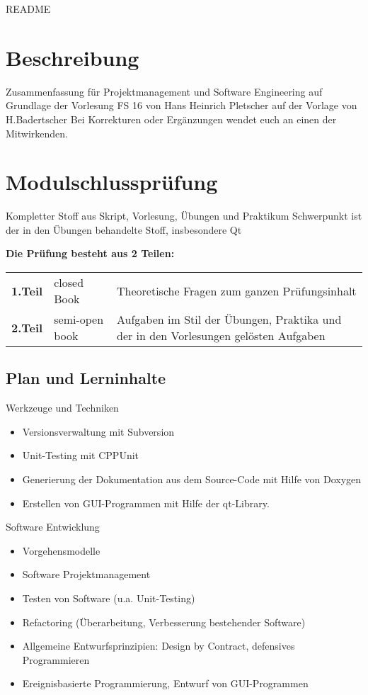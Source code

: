 \thispagestyle{empty}
\setcounter{page}{0} %
{\huge README }
\section*{Beschreibung}
Zusammenfassung für Projektmanagement und Software Engineering auf Grundlage der Vorlesung FS 16 von Hans Heinrich Pletscher auf der Vorlage von H.Badertscher \newline
Bei Korrekturen oder Ergänzungen wendet euch an einen der Mitwirkenden.

\section*{Modulschlussprüfung}
Kompletter Stoff aus Skript, Vorlesung, Übungen und Praktikum \newline
Schwerpunkt ist der in den Übungen behandelte Stoff, insbesondere Qt

\textbf{Die Prüfung besteht aus 2 Teilen:}\newline
\begin{tabular}{p{1.5cm} p{3cm} p{10cm}}
    \textbf{ 1.Teil}   & closed Book & Theoretische Fragen zum ganzen Prüfungsinhalt \\ 
    \textbf{ 2.Teil}   & semi-open book & Aufgaben im Stil der Übungen, Praktika und der in den Vorlesungen gelösten Aufgaben \\ 
\end{tabular} 

\subsection*{Plan und Lerninhalte}
{\scriptsize 
Werkzeuge und Techniken\newline
    \begin{itemize}
        \item Versionsverwaltung mit Subversion
        \item Unit-Testing mit CPPUnit
        \item Generierung der Dokumentation aus dem Source-Code mit Hilfe von Doxygen
        \item Erstellen von GUI-Programmen mit Hilfe der qt-Library.
    \end{itemize}
Software Entwicklung
\begin{itemize}
    \item Vorgehensmodelle
    \item Software Projektmanagement
    \item Testen von Software (u.a. Unit-Testing)
    \item Refactoring (Überarbeitung, Verbesserung bestehender Software)
    \item Allgemeine Entwurfsprinzipien: Design by Contract, defensives Programmieren
    \item Ereignisbasierte Programmierung, Entwurf von GUI-Programmen
\end{itemize}
}
\vfill
